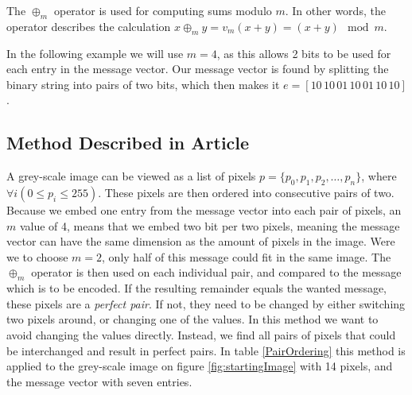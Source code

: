 The $\oplus_m$ operator is used for computing sums modulo $m$.
In other words, the operator describes the calculation $x \oplus_m y = v_m(x + y) = (x + y) \mod m$.  

In the following example we will use $m = 4$, as this allows 2 bits to be used for each entry in the message vector.
Our message vector is found by splitting the binary string into pairs of two bits, which then makes it $e = [10 \, 10 \, 01 \, 10 \, 01 \, 10 \, 10]$. 

\subsection{Method Described in Article}
A grey-scale image can be viewed as a list of pixels $p = \{ p_0, p_1, p_2, \ldots, p_n \}$, where $\forall i\left( 0 \leq p_i \leq 255 \right)$. 
These pixels are then ordered into consecutive pairs of two.
Because we embed one entry from the message vector into each pair of pixels, an $m$ value of 4, means that we embed two bit per two pixels, meaning the message vector can have the same dimension as the amount of pixels in the image. 
Were we to choose $m = 2$, only half of this message could fit in the same image.
The $\oplus_m$ operator is then used on each individual pair, and compared to the message which is to be encoded.
If the resulting remainder equals the wanted message, these pixels are a \textit{perfect pair}.
If not, they need to be changed by either switching two pixels around, or changing one of the values.
In this method we want to avoid changing the values directly.
Instead, we find all pairs of pixels that could be interchanged and result in perfect pairs.
In table \ref{PairOrdering} this method is applied to the grey-scale image on figure \ref{fig:startingImage} with 14 pixels, and the message vector with seven entries. 

